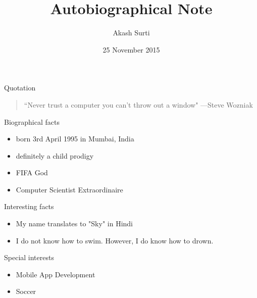 \documentclass{beamer}
\title{Autobiographical Note}
\author{Akash Surti}
\institute{Cornell College}
\date{25 November 2015}
\begin{document}
\begin{frame}
  \titlepage
\end{frame}

\begin{frame}{Quotation}
\begin{quotation}
\noindent
``Never trust a computer you can't throw
  out a window"
  \flushright
  ---Steve Wozniak
  \end{quotation}
\end{frame}

\begin{frame}{Biographical facts}
\begin{itemize}
  \item born 3rd April 1995 in Mumbai, India
  \item definitely a child prodigy
  \item FIFA God
  \item Computer Scientist Extraordinaire
  \end{itemize}
\end{frame}

\begin{frame}{Interesting facts}
\begin{itemize}
  \item My name translates to "Sky" in Hindi
  \item I do not know how to swim. However,
        I do know how to drown.
  \end{itemize}
\end{frame}

\begin{frame}{Special interests}
\begin{itemize}
  \item Mobile App Development
  \item Soccer
  \end{itemize}
\end{frame}
\end{document}
